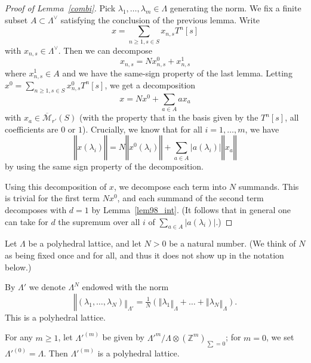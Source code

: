 \begin{proof}[{Proof of Lemma~\ref{combi}}]
  \leanok
  Pick $\lambda_1,\ldots,\lambda_m\in \Lambda$ generating the norm. We fix a finite subset $A\subset \Lambda^\vee$ satisfying the conclusion of the previous lemma. Write
  \[
  x=\sum_{n\geq 1, s\in S} x_{n,s} T^n [s]
  \]
  with $x_{n,s}\in \Lambda^\vee$. Then we can decompose
  \[
  x_{n,s} = N x_{n,s}^0 + x_{n,s}^1
  \]
  where $x_{n,s}^1\in A$ and we have the same-sign property of the last lemma. Letting $x^0 = \sum_{n\geq 1, s\in S} x_{n,s}^0 T^n [s]$, we get a decomposition
  \[
  x = Nx^0 + \sum_{a\in A} a x_a
  \]
  with $x_a\in \overline{\mathcal M}_{r'}(S)$ (with the property that in the
  basis given by the $T^n [s]$, all coefficients are $0$ or $1$). Crucially,
  we know that for all $i=1,\ldots,m$, we have
  \[
  ‖x(\lambda_i)‖ = N ‖x^0(\lambda_i)‖ + \sum_{a\in A} |a(\lambda_i)| ‖x_a‖
  \]
  by using the same sign property of the decomposition.

  Using this decomposition of $x$, we decompose each term into $N$ summands.
  This is trivial for the first term $Nx^0$,
  and each summand of the second term decomposes with $d = 1$ by Lemma~\ref{lem98_int}.
  (It follows that in general one can take for $d$
  the supremum over all $i$ of $\sum_{a\in A} |a(\lambda_i)|$.)
\end{proof}

\begin{definition}
  \label{rescaled-sum}
  \leanok
  Let $\Lambda$ be a polyhedral lattice, and let $N > 0$ be a natural number.
  (We think of $N$ as being fixed once and for all,
  and thus it does not show up in the notation below.)

  By $\Lambda'$ we denote $\Lambda^N$ endowed with the norm
  \[
	  ‖(\lambda_1,\ldots,\lambda_N)‖_{\Lambda'} = \tfrac 1N(‖\lambda_1‖_\Lambda+\ldots+‖\lambda_N‖_\Lambda).
  \]
  This is a polyhedral lattice.
\end{definition}

\begin{lemma}
  \label{polyhedral-quotient}
  \leanok
  For any $m\geq 1$, let $\Lambda'^{(m)}$ be given by $\Lambda'^m / \Lambda\otimes (\mathbb Z^m)_{\sum=0}$;
  for $m=0$, we set $\Lambda'^{(0)} = \Lambda$.
  Then $\Lambda'^{(m)}$ is a polyhedral lattice.
\end{lemma}


